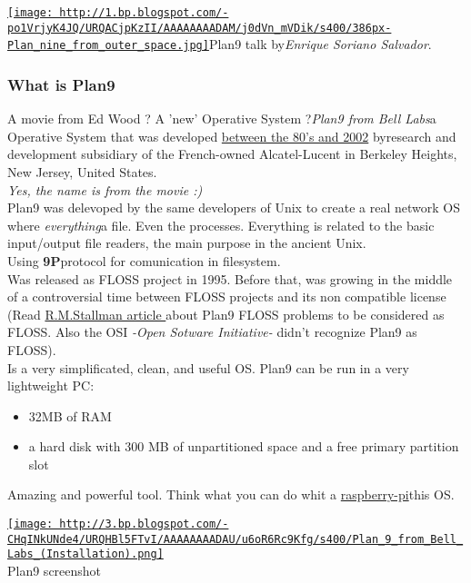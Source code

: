 \href{http://1.bp.blogspot.com/-po1VrjyK4JQ/URQACjpKzII/AAAAAAAADAM/j0dVn_mVDik/s1600/386px-Plan_nine_from_outer_space.jpg}{
\texttt{[image: http://1.bp.blogspot.com/-po1VrjyK4JQ/URQACjpKzII/AAAAAAAADAM/j0dVn\_mVDik/s400/386px-Plan\_nine\_from\_outer\_space.jpg]}}Plan9 talk by\nolinebreak\textit{Enrique Soriano Salvador}.
\\

\subsubsection{ What is Plan9} A movie from Ed Wood ? A 'new' Operative System ?\textit{Plan9 from Bell Labs}\nolinebreakis a Operative System that was developed \href{http://swtch.com/plan9history/}{between the 80's and 2002} by\nolinebreakthe research and development subsidiary of the French-owned Alcatel-Lucent in Berkeley Heights, New Jersey, United States.
\\\textit{Yes, the name is from the movie :)\nolinebreak}
\\ Plan9 was delevoped by the same developers of Unix to create a real network OS where \textit{everything}\nolinebreakis a file. Even the processes. Everything is related to the basic input/output file readers, the main purpose in the ancient Unix.
\\ Using \textbf{9P}\nolinebreaktheir protocol for comunication in filesystem.
\\ Was released as FLOSS project in 1995. Before that, was growing in the middle of a controversial time between FLOSS projects and its non compatible license (Read \href{http://www.gnu.org/philosophy/plan-nine.en.html}{R.M.Stallman article }about Plan9 FLOSS problems to be considered as FLOSS. Also the OSI \textit{-Open Sotware Initiative-} didn't recognize Plan9 as FLOSS).
\\ Is a very simplificated, clean, and useful OS. Plan9 can be run in a very lightweight PC:
\begin{itemize}
	\item 32MB of RAM
	\item a hard disk with 300 MB of unpartitioned space and a free primary partition slot
\end{itemize} Amazing and powerful tool. Think what you can do whit a \href{http://www.raspberrypi.org/}{raspberry-pi}\nolinebreakand this OS.
\\
\begin{tabular}\href{http://3.bp.blogspot.com/-CHqINkUNde4/URQHBl5FTvI/AAAAAAAADAU/u6oR6Rc9Kfg/s1600/Plan_9_from_Bell_Labs_(Installation).png}{
\texttt{[image: http://3.bp.blogspot.com/-CHqINkUNde4/URQHBl5FTvI/AAAAAAAADAU/u6oR6Rc9Kfg/s400/Plan\_9\_from\_Bell\_Labs\_(Installation).png]}} \\ 
Plan9 screenshot
\end{tabular}

